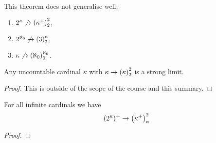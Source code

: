 This theorem does not generalise well:
\begin{enumerate}
    \item \(2^{\kappa}\not\to\left(\kappa^{+}\right)_{2}^{2}\),
    \item \(2^{\aleph_{0}}\not\to\left(3\right)_{2}^{\kappa}\),
    \item \(\kappa\not\to\left(\aleph_{0}\right)_{0}^{\aleph_{0}}\).
\end{enumerate}

\begin{proposition}
    Any uncountable cardinal \(\kappa\) with \(\kappa\to\left(\kappa\right)_{2}^{2}\)
    is a strong limit.

    \begin{proof}
        This is outside of the scope of the course and this summary.
    \end{proof}
\end{proposition}

\begin{theorem}
    For all infinite cardinals we have
    \[
        (2^{\kappa})^{+}\to\left(\kappa^{+}\right)_{\kappa}^{2}
    \]

    \begin{proof}
    \end{proof}
\end{theorem}